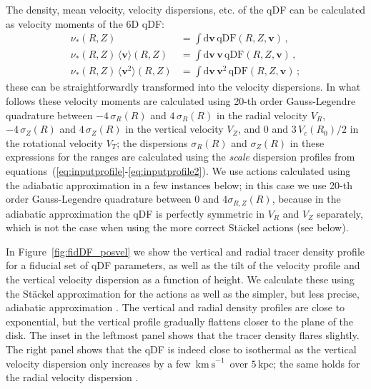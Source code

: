 \documentclass{emulateapj}
\newcommand{\dd}{\mathrm{d}}
\newcommand{\eg}{e.g.}
\newcommand{\eqnname}{equation}
\newcommand{\equationname}{\eqnname}
\renewcommand{\figurename}{Figure}
\renewcommand{\vec}[1]{\ensuremath{\mathbf{#1}}}
\newcommand{\vecv}{\ensuremath{\vec{v}}}
\newcommand{\kpc}{\ensuremath{\,\mathrm{kpc}}}
\newcommand{\kms}{\ensuremath{\,\mathrm{km\ s}^{-1}}}
\begin{document}
The density, mean velocity, velocity dispersions, etc. of the qDF can
be calculated as velocity moments of the 6D qDF:
\begin{align}\label{eq:outputprofile}
\nu_*(R,Z) & = \int \dd \vecv \,\mathrm{qDF}(R,Z,\vecv)\,,\\
\nu_*(R,Z)\,\langle \vecv \rangle(R,Z)  & = \int \dd \vecv \,\vecv\,\mathrm{qDF}(R,Z,\vecv)\,,\\
\nu_*(R,Z)\,\langle \vecv^2 \rangle(R,Z)  & = \int \dd \vecv \,\vecv^2\,\mathrm{qDF}(R,Z,\vecv)\,;
\end{align}
these can be straightforwardly transformed into the velocity
dispersions. In what follows these velocity moments are calculated
using 20-th order Gauss-Legendre quadrature between $-4\,\sigma_R(R)$
and $4\,\sigma_R(R)$ in the radial velocity $V_R$, $-4\,\sigma_Z(R)$
and $4\,\sigma_Z(R)$ in the vertical velocity $V_Z$, and $0$ and
$3\,V_c(R_0)/2$ in the rotational velocity $V_T$; the dispersions
$\sigma_R(R)$ and $\sigma_Z(R)$ in these expressions for the ranges
are calculated using the \emph{scale} dispersion profiles from
\equationname s~(\ref{eq:inputprofile}-\ref{eq:inputprofile2}). We use
actions calculated using the adiabatic approximation in a few
instances below; in this case we use 20-th order Gauss-Legendre
quadrature between $0$ and $4\sigma_{R,Z}(R)$, because in the
adiabatic approximation the qDF is perfectly symmetric in $V_R$ and
$V_Z$ separately, which is not the case when using the more correct
St\"{a}ckel actions (see below).

In \figurename~\ref{fig:fidDF_posvel} we show the vertical and radial
tracer density profile for a fiducial set of qDF parameters, as well
as the tilt of the velocity profile and the vertical velocity
dispersion as a function of height. We calculate these using the
St\"{a}ckel approximation for the actions as well as the simpler, but
less precise, adiabatic approximation \citep[\eg.][]{Binney10a}. The
vertical and radial density profiles are close to exponential, but the
vertical profile gradually flattens closer to the plane of the
disk. The inset in the leftmost panel shows that the tracer density
flares slightly. The right panel shows that the qDF is indeed close to
isothermal as the vertical velocity dispersion only increases by a few
\kms\ over $5\kpc$; the same holds for the radial velocity dispersion
\citep[see also][]{Ting13a}.
\end{document}
